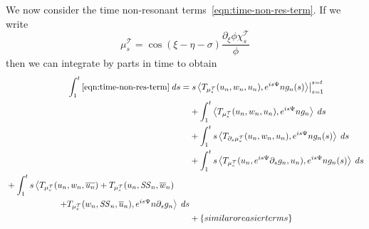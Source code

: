 \documentclass[letterpaper, reqno,final]{amsart}
\newcommand{\cT}{\mathcal{T}}
\newcommand{\mSS}{\mathit{SS}}
\newcommand{\discrAvg}{\Psi}
\newcommand{\btext}[1]{\left\{\textup{#1}\right\}}
\newcommand{\bsime}{\btext{similar or easier terms}}
\begin{document}
We now consider the time non-resonant terms~\eqref{eqn:time-non-res-term}.  If we write
\begin{equation*}
    \mu^\cT_s = \cos(\xi - \eta - \sigma) \frac{\partial_\xi \phi \chi^\cT_s}{\phi}
\end{equation*}
then we can integrate by parts in time to obtain
\begin{subequations}\begin{align}%
   \int_1^t \eqref{eqn:time-non-res-term} \;ds =& \left. s \left\langle T_{\mu^\cT_s}(u_n, w_n, u_n), e^{is\discrAvg} n g_n(s) \right\rangle \right|_{s = 1}^{s=t} \label{eqn:tnr-bdy}\\
   &+ \int_1^t \left\langle T_{\mu^\cT_s}(u_n, w_n, u_n), e^{is\discrAvg} n g_n \right\rangle\;ds \label{eqn:tnr-no-s}\\
   &+ \int_1^t s \left\langle T_{\partial_s \mu^\cT_s}(u_n, w_n, u_n), e^{is\discrAvg} n g_n(s) \right\rangle\;ds \label{eqn:tnr-deriv-hits-symbol}\\
   &+ \int_1^t s \left\langle T_{\mu^\cT_s}(u_n, e^{is\discrAvg} \partial_s g_n, u_n), e^{is\discrAvg} n g_n(s) \right\rangle\;ds \label{eqn:tnr-deriv-hits-function}\\
   \begin{split}&+ \int_1^t s \left\langle T_{\mu^\cT_s}(u_n, w_n, \overline{u_n}) + T_{\mu^\cT_s}(u_n, \mSS_n, \overline{w}_n)\right.\\
   &\qquad\qquad\qquad \left.+ T_{\mu^\cT_s}(w_n, \mSS_n, \overline{u}_n), e^{is\discrAvg} n \partial_s g_n\right\rangle\;ds \end{split}\label{eqn:tnr-deriv-hits-IP}\\
   &+ \bsime\nonumber
\end{align}\end{subequations}
\end{document}
